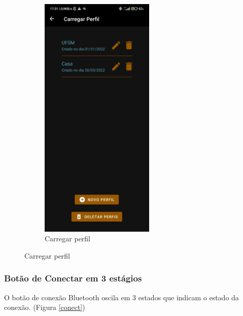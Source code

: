 \begin{figure}[H]
\begin{subfigure}[b]{0.4\textwidth}
		\includegraphics[width=0.6\textwidth]{figuras/desAplicativo/load}
		\caption{Carregar perfil}
		\label{load}
	\end{subfigure}
\end{figure}

\subsubsection{Botão de Conectar em 3 estágios}
O botão de conexão Bluetooth oscila em 3 estados que indicam o estado da conexão. (Figura \ref{conect})

